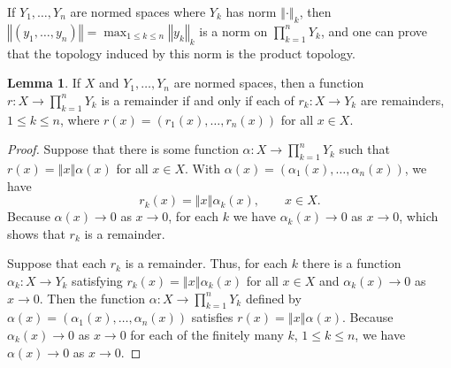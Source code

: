 \documentclass{article}
\newcommand{\norm}[1]{\left\Vert #1 \right\Vert}
\theoremstyle{definition}
\newtheorem{lemma}[theorem]{Lemma}
\theoremstyle{definition}
\begin{document}
If $Y_1,\ldots,Y_n$ are normed spaces where $Y_k$ has norm $\norm{\cdot}_k$, then 
$\norm{(y_1,\ldots,y_n)} = \max_{1 \leq k \leq n} \norm{y_k}_k$ is a norm
on $\prod_{k=1}^n Y_k$, and one can prove that the topology induced by this norm is the product
topology.

\begin{lemma}
If $X$ and $Y_1,\ldots,Y_n$ are normed spaces, then a function
$r:X \to \prod_{k=1}^n Y_k$ is a remainder
 if and only if 
each of $r_k:X \to Y_k$ are remainders, $1 \leq k \leq n$, where
 $r(x)=(r_1(x),\ldots,r_n(x))$ for all $x \in X$.
\end{lemma}
\begin{proof}
Suppose that there is some function $\alpha:X \to \prod_{k=1}^n Y_k$ such that
$r(x)=\norm{x} \alpha(x)$ for all $x \in X$. With $\alpha(x)=(\alpha_1(x),\ldots,\alpha_n(x))$, we have
\[
r_k(x)=\norm{x} \alpha_k(x), \qquad x \in X.
\]
Because $\alpha(x) \to 0$ as $x \to 0$, for each $k$ we have $\alpha_k(x) \to 0$ as $x \to 0$, which shows that
$r_k$ is a remainder.

Suppose that each $r_k$ is a remainder. Thus, for each $k$ there is a function $\alpha_k:X \to Y_k$
satisfying $r_k(x)=\norm{x} \alpha_k(x)$ for all $x \in X$ and $\alpha_k(x) \to 0$ as $x \to 0$. Then the function
$\alpha:X \to \prod_{k=1}^n Y_k$ defined by $\alpha(x)=(\alpha_1(x),\ldots,\alpha_n(x))$ satisfies
$r(x)=\norm{x} \alpha(x)$. Because $\alpha_k(x) \to 0$ as $x \to 0$ for each of the finitely many $k$, $1 \leq k \leq n$, 
we have $\alpha(x) \to 0$ as $x \to 0$.
\end{proof}
\end{document}
